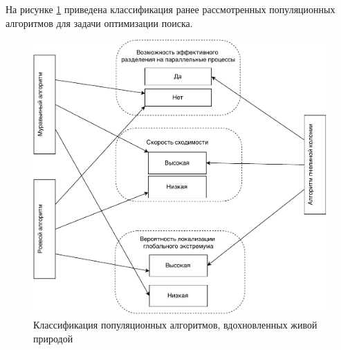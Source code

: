 На рисунке \ref{fig:class} приведена классификация ранее рассмотренных популяционных алгоритмов для задачи оптимизации поиска.\clearpage

\begin{figure}[h]
	\begin{center}
	\includegraphics[pages=-, scale=0.95]{./inc/img/class.pdf}
	\caption{Классификация популяционных алгоритмов, вдохновленных живой природой}  
	\label{fig:class}
\end{center}
\end{figure}


